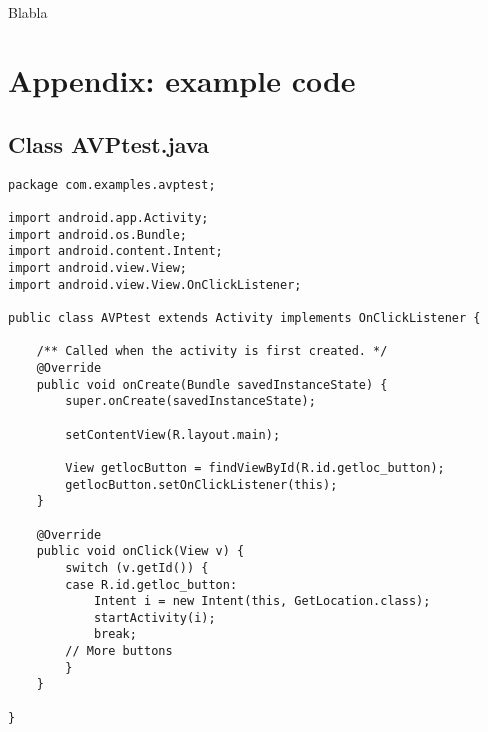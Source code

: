\documentclass[letterpaper,twocolumn,10pt]{article}
\begin{document}
\paragraph{}
Blabla


{\footnotesize 

}

\theendnotes

\vfill
\break

\onecolumn
\appendix
\label{app:appendixA}
\lstset{language=Java}  
\section{Appendix: example code}

\subsection{Class AVPtest.java}
\begin{lstlisting}
package com.examples.avptest;

import android.app.Activity;
import android.os.Bundle;
import android.content.Intent;
import android.view.View;
import android.view.View.OnClickListener;

public class AVPtest extends Activity implements OnClickListener {

	/** Called when the activity is first created. */
	@Override
	public void onCreate(Bundle savedInstanceState) {
		super.onCreate(savedInstanceState);

		setContentView(R.layout.main);
		
		View getlocButton = findViewById(R.id.getloc_button);
		getlocButton.setOnClickListener(this);
	}

	@Override
	public void onClick(View v) {
		switch (v.getId()) {
		case R.id.getloc_button:
			Intent i = new Intent(this, GetLocation.class);
			startActivity(i);
			break;
		// More buttons
		}
	}

}
\end{lstlisting}
\end{document}
